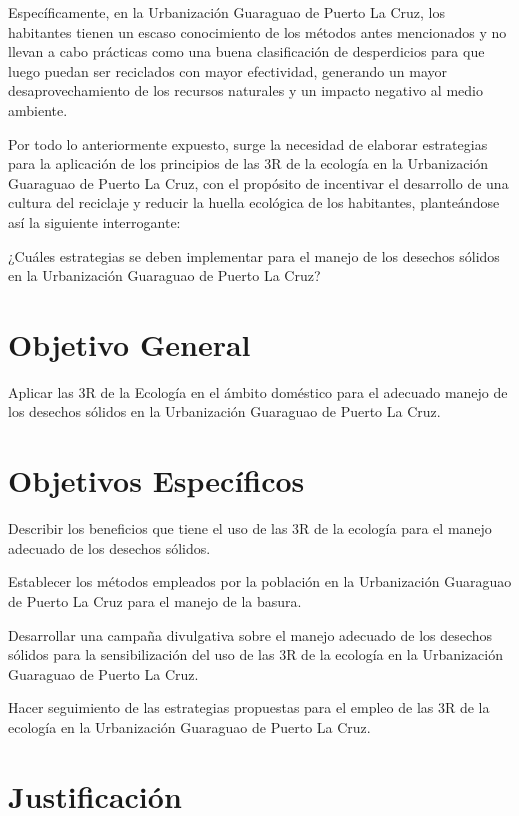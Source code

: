 Específicamente, en la Urbanización Guaraguao de Puerto La Cruz, los habitantes tienen un escaso conocimiento de los métodos antes mencionados y no llevan a cabo prácticas como una buena clasificación de desperdicios para que luego puedan ser reciclados con mayor efectividad, generando un mayor desaprovechamiento de los recursos naturales y un impacto negativo al medio ambiente. 

Por todo lo anteriormente expuesto, surge la necesidad de elaborar estrategias para la aplicación de los principios de las 3R de la ecología en la Urbanización Guaraguao de Puerto La Cruz, con el propósito de incentivar el desarrollo de una cultura del reciclaje y reducir la huella ecológica de los habitantes, planteándose así la siguiente interrogante:

¿Cuáles estrategias se deben implementar para el manejo de los desechos sólidos en la Urbanización Guaraguao de Puerto La Cruz?

\newpage

\section{Objetivo General}

Aplicar las 3R de la Ecología en el ámbito doméstico para el adecuado manejo de los desechos sólidos en la Urbanización Guaraguao de Puerto La Cruz.

\section{Objetivos Específicos}

Describir los beneficios que tiene el uso de las 3R de la ecología para el manejo adecuado de los desechos sólidos.

Establecer los métodos empleados por la población en la Urbanización Guaraguao de Puerto La Cruz para el manejo de la basura.

Desarrollar una campaña divulgativa sobre el manejo adecuado de los desechos sólidos para la sensibilización del uso de las 3R de la ecología en la Urbanización Guaraguao de Puerto La Cruz.

Hacer seguimiento de las estrategias propuestas para el empleo de las 3R de la ecología en la Urbanización Guaraguao de Puerto La Cruz.

\newpage

\section{Justificación}

